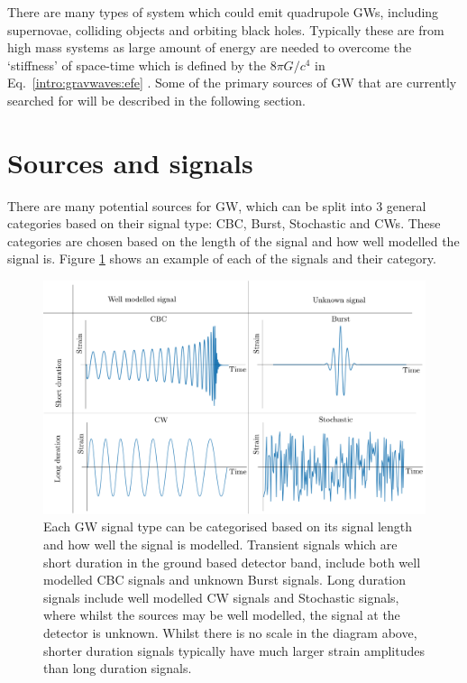 There are many types of system which could emit quadrupole \glspl{GW}, including supernovae, colliding objects and orbiting black holes. 
Typically these are from high mass systems as large amount of energy are needed to overcome the `stiffness' of space-time which is defined by the $8 \pi G/c^4$ in Eq.~\ref{intro:gravwaves:efe} .
Some of the primary sources of \gls{GW} that are currently searched for will be described in the following section.




\section{\label{intro:sources}Sources and signals}

There are many potential sources for \gls{GW}, which can be split into 3
general categories based on their signal type: \gls{CBC}, Burst, Stochastic and
\glspl{CW}.  These categories are chosen based on the length of the signal and
how well modelled the signal is.  Figure \ref{intro:sources:signaltypes} shows
an example of each of the signals and their category.
%
\begin{figure}[h]
    \centering
    \includegraphics[width=\textwidth]{C1_intro/sources_types.pdf}
    \caption[GW signal types]{Each \gls{GW} signal type can be categorised
based on its signal length and how well the signal is modelled. Transient
signals which are short duration in the ground based detector band, include
both well modelled \gls{CBC} signals and unknown Burst signals. Long duration
signals include well modelled \gls{CW} signals and Stochastic
signals, where whilst the sources may be well modelled, the signal at the detector is unknown.
Whilst there is no scale in the diagram above, shorter duration signals typically have much larger strain amplitudes than long duration signals.}
\label{intro:sources:signaltypes}
\end{figure}

